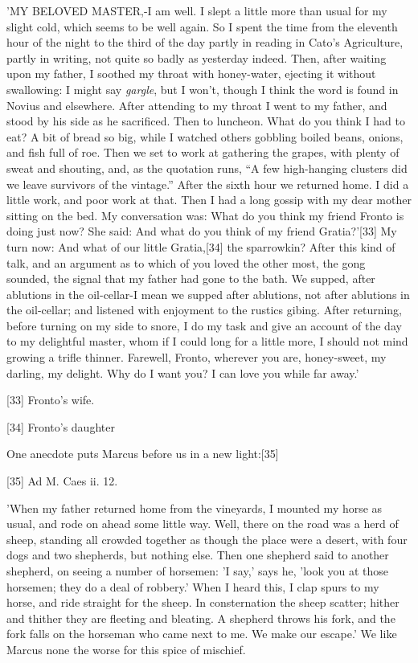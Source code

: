 'MY BELOVED MASTER,-I am well. I slept a little more than usual for my
slight cold, which seems to be well again. So I spent the time from the
eleventh hour of the night to the third of the day partly in reading in
Cato's Agriculture, partly in writing, not quite so badly as yesterday
indeed. Then, after waiting upon my father, I soothed my throat with
honey-water, ejecting it without swallowing: I might say \emph{gargle}, but I
won't, though I think the word is found in Novius and elsewhere. After
attending to my throat I went to my father, and stood by his side as he
sacrificed. Then to luncheon. What do you think I had to eat? A bit of
bread so big, while I watched others gobbling boiled beans, onions, and
fish full of roe. Then we set to work at gathering the grapes, with plenty
of sweat and shouting, and, as the quotation runs, ``A few high-hanging
clusters did we leave survivors of the vintage.'' After the sixth hour we
returned home. I did a little work, and poor work at that. Then I had a
long gossip with my dear mother sitting on the bed. My conversation was:
What do you think my friend Fronto is doing just now? She said: And what
do you think of my friend Gratia?'[33]
My turn now: And what of our little Gratia,[34]
the sparrowkin? After this kind of talk, and an argument as to which of
you loved the other most, the gong sounded, the signal that my father had
gone to the bath. We supped, after ablutions in the oil-cellar-I mean we
supped after ablutions, not after ablutions in the oil-cellar; and
listened with enjoyment to the rustics gibing. After returning, before
turning on my side to snore, I do my task and give an account of the day
to my delightful master, whom if I could long for a little more, I should
not mind growing a trifle thinner. Farewell, Fronto, wherever you are,
honey-sweet, my darling, my delight. Why do I want you? I can love you
while far away.'

[33]
Fronto's wife.

[34]
Fronto's daughter

One anecdote puts Marcus before us in a new light:[35]

[35]
Ad M. Caes ii. 12.

'When my father returned home from the vineyards, I mounted my horse as
usual, and rode on ahead some little way. Well, there on the road was a
herd of sheep, standing all crowded together as though the place were a
desert, with four dogs and two shepherds, but nothing else. Then one
shepherd said to another shepherd, on seeing a number of horsemen: 'I
say,' says he, 'look you at those horsemen; they do a deal of robbery.'
When I heard this, I clap spurs to my horse, and ride straight for the
sheep. In consternation the sheep scatter; hither and thither they are
fleeting and bleating. A shepherd throws his fork, and the fork falls on
the horseman who came next to me. We make our escape.' We like Marcus none
the worse for this spice of mischief.

